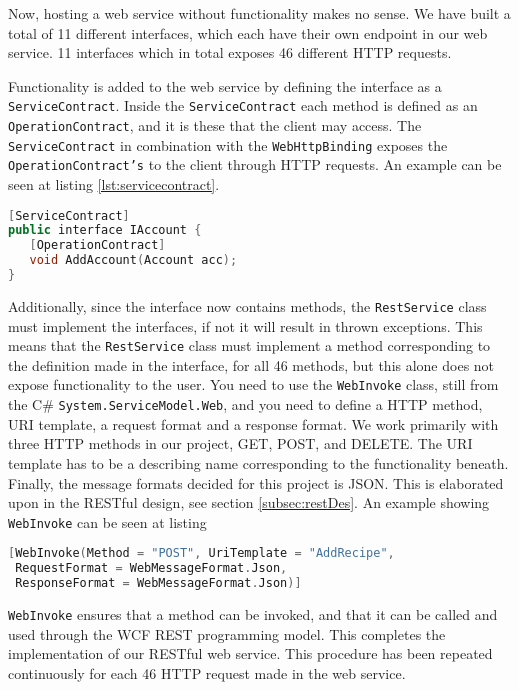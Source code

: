 Now, hosting a web service without functionality makes no sense. We have built a total of 11 different interfaces, which each have their own endpoint in our web service. 11 interfaces which in total exposes 46 different HTTP requests. 

Functionality is added to the web service by defining the interface as a \texttt{ServiceContract}\cite{ServiceContract}. Inside the \texttt{ServiceContract} each method is defined as an \texttt{OperationContract}\cite{OperationContract}, and it is these that the client may access. The \texttt{ServiceContract} in combination with the \texttt{WebHttpBinding} exposes the \texttt{OperationContract's} to the client through HTTP requests. An example can be seen at listing \ref{lst:servicecontract}.

\begin{lstlisting}[language=c++, label={lst:servicecontract}, caption=Definition of a ServiceContract]
[ServiceContract]
public interface IAccount {
   [OperationContract]
   void AddAccount(Account acc);
}
\end{lstlisting}

Additionally, since the interface now contains methods, the \texttt{RestService} class must implement the interfaces, if not it will result in thrown exceptions. This means that the \texttt{RestService} class must implement a method corresponding to the definition made in the interface, for all 46 methods, but this alone does not expose functionality to the user. You need to use the \texttt{WebInvoke}\cite{WebInvoke} class, still from the C\# \texttt{System.ServiceModel.Web}, and you need to define a HTTP method, URI template, a request format and a response format. We work primarily with three HTTP methods in our project, GET, POST, and DELETE. The URI template has to be a describing name corresponding to the functionality beneath. Finally, the message formats decided for this project is JSON. This is elaborated upon in the RESTful design, see section \ref{subsec:restDes}. An example showing \texttt{WebInvoke} can be seen at listing 

\begin{lstlisting}[language=c++, label={lst:webinvoke}, caption=Definition of a WebInvoke]
[WebInvoke(Method = "POST", UriTemplate = "AddRecipe", 
 RequestFormat = WebMessageFormat.Json, 
 ResponseFormat = WebMessageFormat.Json)]
\end{lstlisting}

\texttt{WebInvoke} ensures that a method can be invoked, and that it can be called and used through the WCF REST programming model. This completes the implementation of our RESTful web service. This procedure has been repeated continuously for each 46 HTTP request made in the web service.